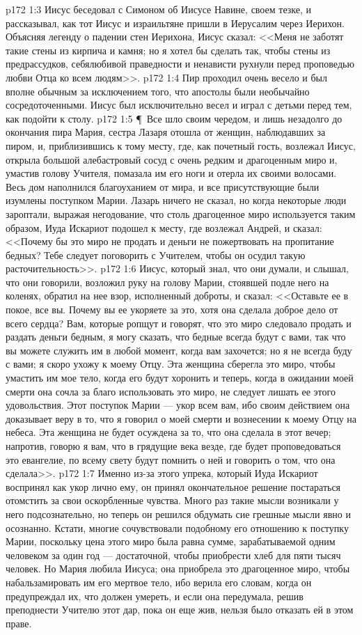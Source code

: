 \vs p172 1:3 Иисус беседовал с Симоном об Иисусе Навине, своем тезке, и рассказывал, как тот Иисус и израильтяне пришли в Иерусалим через Иерихон. Объясняя легенду о падении стен Иерихона, Иисус сказал: <<Меня не заботят такие стены из кирпича и камня; но я хотел бы сделать так, чтобы стены из предрассудков, себялюбивой праведности и ненависти рухнули перед проповедью любви Отца ко всем людям>>.
\vs p172 1:4 Пир проходил очень весело и был вполне обычным за исключением того, что апостолы были необычайно сосредоточенными. Иисус был исключительно весел и играл с детьми перед тем, как подойти к столу.
\vs p172 1:5 \P\ Все шло своим чередом, и лишь незадолго до окончания пира Мария, сестра Лазаря отошла от женщин, наблюдавших за пиром, и, приблизившись к тому месту, где, как почетный гость, возлежал Иисус, открыла большой алебастровый сосуд с очень редким и драгоценным миро и, умастив голову Учителя, помазала им его ноги и отерла их своими волосами. Весь дом наполнился благоуханием от мира, и все присутствующие были изумлены поступком Марии. Лазарь ничего не сказал, но когда некоторые люди зароптали, выражая негодование, что столь драгоценное миро используется таким образом, Иуда Искариот подошел к месту, где возлежал Андрей, и сказал: <<Почему бы это миро не продать и деньги не пожертвовать на пропитание бедных? Тебе следует поговорить с Учителем, чтобы он осудил такую расточительность>>.
\vs p172 1:6 Иисус, который знал, что они думали, и слышал, что они говорили, возложил руку на голову Марии, стоявшей подле него на коленях, обратил на нее взор, исполненный доброты, и сказал: <<Оставьте ее в покое, все вы. Почему вы ее укоряете за это, хотя она сделала доброе дело от всего сердца? Вам, которые ропщут и говорят, что это миро следовало продать и раздать деньги бедным, я могу сказать, что бедные всегда будут с вами, так что вы можете служить им в любой момент, когда вам захочется; но я не всегда буду с вами; я скоро ухожу к моему Отцу. Эта женщина сберегла это миро, чтобы умастить им мое тело, когда его будут хоронить и теперь, когда в ожидании моей смерти она сочла за благо использовать это миро, не следует лишать ее этого удовольствия. Этот поступок Марии --- укор всем вам, ибо своим действием она доказывает веру в то, что я говорил о моей смерти и вознесении к моему Отцу на небеса. Эта женщина не будет осуждена за то, что она сделала в этот вечер; напротив, говорю я вам, что в грядущие века везде, где будет проповедоваться это евангелие, по всему свету будут помнить о ней и говорить о том, что она сделала>>.
\vs p172 1:7 Именно из\hyp{}за этого упрека, который Иуда Искариот воспринял как укор лично ему, он принял окончательное решение постараться отомстить за свои оскорбленные чувства. Много раз такие мысли возникали у него подсознательно, но теперь он решился обдумать сие грешные мысли явно и осознанно. Кстати, многие сочувствовали подобному его отношению к поступку Марии, поскольку цена этого миро была равна сумме, зарабатываемой одним человеком за один год --- достаточной, чтобы приобрести хлеб для пяти тысяч человек. Но Мария любила Иисуса; она приобрела это драгоценное миро, чтобы набальзамировать им его мертвое тело, ибо верила его словам, когда он предупреждал их, что должен умереть, и если она передумала, решив преподнести Учителю этот дар, пока он еще жив, нельзя было отказать ей в этом праве.
